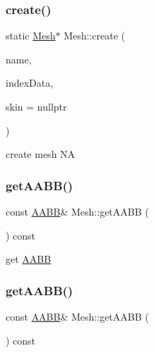 \subsubsection{\texorpdfstring{create()}{create()}\hspace{0.1cm}{\footnotesize\ttfamily [8/8]}}
{\footnotesize\ttfamily static \hyperlink{classMesh}{Mesh}$\ast$ Mesh\+::create (\begin{DoxyParamCaption}\item[{const std\+::string \&}]{name,  }\item[{\hyperlink{classMeshIndexData}{Mesh\+Index\+Data} $\ast$}]{index\+Data,  }\item[{\hyperlink{classMeshSkin}{Mesh\+Skin} $\ast$}]{skin = {\ttfamily nullptr} }\end{DoxyParamCaption})\hspace{0.3cm}{\ttfamily [static]}}

create mesh  NA \mbox{\label{classMesh_a62a70c82c57dabc8c728756df13c805d}} 
\subsubsection{\texorpdfstring{get\+A\+A\+B\+B()}{getAABB()}\hspace{0.1cm}{\footnotesize\ttfamily [1/2]}}
{\footnotesize\ttfamily const \hyperlink{classAABB}{A\+A\+BB}\& Mesh\+::get\+A\+A\+BB (\begin{DoxyParamCaption}{ }\end{DoxyParamCaption}) const\hspace{0.3cm}{\ttfamily [inline]}}

get \hyperlink{classAABB}{A\+A\+BB} \mbox{\label{classMesh_a62a70c82c57dabc8c728756df13c805d}} 
\subsubsection{\texorpdfstring{get\+A\+A\+B\+B()}{getAABB()}\hspace{0.1cm}{\footnotesize\ttfamily [2/2]}}
{\footnotesize\ttfamily const \hyperlink{classAABB}{A\+A\+BB}\& Mesh\+::get\+A\+A\+BB (\begin{DoxyParamCaption}{ }\end{DoxyParamCaption}) const\hspace{0.3cm}{\ttfamily [inline]}}


